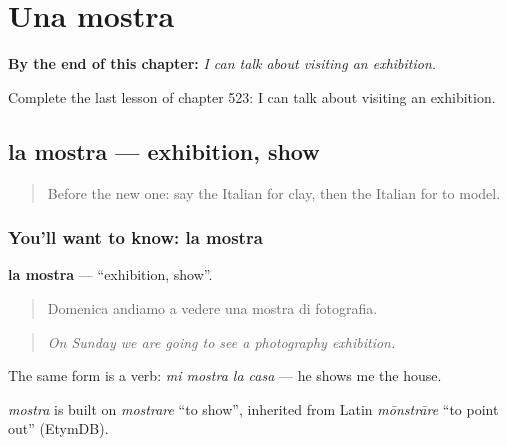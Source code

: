 
\chapter{Una mostra}
\label{ch:it-una-mostra}

\begin{chapteropening}
\textbf{By the end of this chapter:} \emph{I can talk about visiting an exhibition.}

Complete the last lesson of chapter 523: I can talk about visiting an exhibition.
\end{chapteropening}

\section[la mostra]{la mostra — exhibition, show}

\label{lesson:IT-C523-mostra}



\begin{quote}
Before the new one: say the Italian for clay, then the Italian for to model.
\end{quote}

\subsection*{You'll want to know: la mostra}
\textbf{la mostra} — \textquotedblleft{}exhibition, show\textquotedblright{}.

\begin{quote}
Domenica andiamo a vedere una mostra di fotografia.
\end{quote}

\begin{quote}
\emph{On Sunday we are going to see a photography exhibition.}
\end{quote}

The same form is a verb: \emph{mi mostra la casa} — he shows me the house.

\begin{cousinweb}
\emph{mostra} is built on \emph{mostrare} \textquotedblleft{}to show\textquotedblright{}, inherited from Latin \emph{mōnstrāre} \textquotedblleft{}to point out\textquotedblright{} (EtymDB).
\end{cousinweb}

